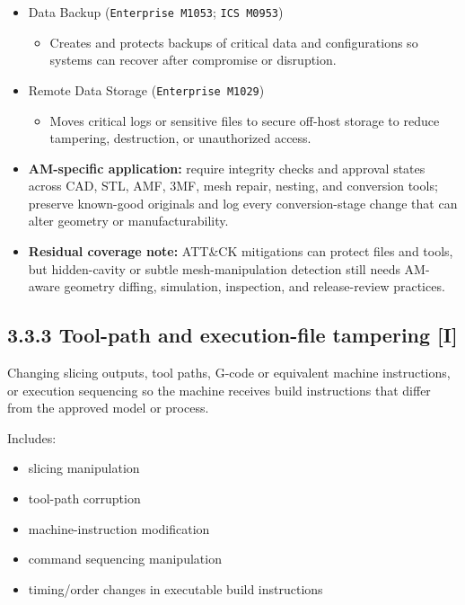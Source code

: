 \documentclass[10pt,a4paper,oneside]{report}
\begin{document}
\begin{itemize}
\begin{itemize}
\begin{itemize}
\end{itemize}
\item Data Backup (\texttt{Enterprise M1053}; \texttt{ICS M0953})
\begin{itemize}
\item Creates and protects backups of critical data and configurations so systems can recover after compromise or disruption.
\end{itemize}
\item Remote Data Storage (\texttt{Enterprise M1029})
\begin{itemize}
\item Moves critical logs or sensitive files to secure off-host storage to reduce tampering, destruction, or unauthorized access.
\end{itemize}
\end{itemize}
\end{itemize}

\begin{itemize}
\item \textbf{AM-specific application:} require integrity checks and approval states across CAD, STL, AMF, 3MF, mesh repair, nesting, and conversion tools; preserve known-good originals and log every conversion-stage change that can alter geometry or manufacturability.
\end{itemize}

\begin{itemize}
\item \textbf{Residual coverage note:} ATT\&CK mitigations can protect files and tools, but hidden-cavity or subtle mesh-manipulation detection still needs AM-aware geometry diffing, simulation, inspection, and release-review practices.
\end{itemize}


\subsection{3.3.3 Tool-path and execution-file tampering [I]}


Changing slicing outputs, tool paths, G-code or equivalent machine instructions, or execution sequencing so the machine receives build instructions that differ from the approved model or process.

Includes:

\begin{itemize}
\item slicing manipulation
\item tool-path corruption
\item machine-instruction modification
\item command sequencing manipulation
\item timing/order changes in executable build instructions
\end{itemize}
\end{document}
